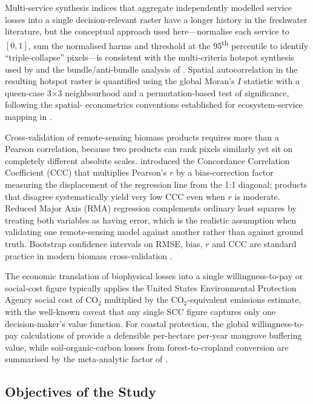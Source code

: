 \documentclass[12pt,a4paper]{article}
\begin{document}
Multi-service synthesis indices that aggregate independently modelled
service losses into a single decision-relevant raster have a longer
history in the freshwater literature, but the conceptual approach used
here---normalise each service to $[0,1]$, sum the normalised harms
and threshold at the 95\textsuperscript{th} percentile to identify
``triple-collapse'' pixels---is consistent with the multi-criteria
hotspot synthesis used by \citet{egoh2008} and the bundle/anti-bundle
analysis of \citet{rao2018}. Spatial autocorrelation in the resulting
hotspot raster is quantified using the global Moran's $I$ statistic
\citep{moran1950} with a queen-case 3$\times$3 neighbourhood and a
permutation-based test of significance, following the spatial-
econometrics conventions established for ecosystem-service mapping in
\citet{anselin1995}.

Cross-validation of remote-sensing biomass products requires more than
a Pearson correlation, because two products can rank pixels similarly
yet sit on completely different absolute scales. \citet{lin1989}
introduced the Concordance Correlation Coefficient (CCC) that
multiplies Pearson's $r$ by a bias-correction factor measuring the
displacement of the regression line from the 1:1 diagonal; products
that disagree systematically yield very low CCC even when $r$ is
moderate. Reduced Major Axis (RMA) regression \citep{warton2006}
complements ordinary least squares by treating both variables as
having error, which is the realistic assumption when validating one
remote-sensing model against another rather than against ground
truth. Bootstrap confidence intervals on RMSE, bias, $r$ and CCC are
standard practice in modern biomass cross-validation
\citep{efron1993}.

The economic translation of biophysical losses into a single
willingness-to-pay or social-cost figure typically applies the United
States Environmental Protection Agency social cost of CO$_2$
\citep{epa2023} multiplied by the CO$_2$-equivalent emissions
estimate, with the well-known caveat that any single SCC figure
captures only one decision-maker's value function. For coastal
protection, the global willingness-to-pay calculations of
\citet{menendez2020} provide a defensible per-hectare per-year
mangrove buffering value, while soil-organic-carbon losses from
forest-to-cropland conversion are summarised by the meta-analytic
factor of \citet{don2011}.

\subsection{Objectives of the Study}
\end{document}
